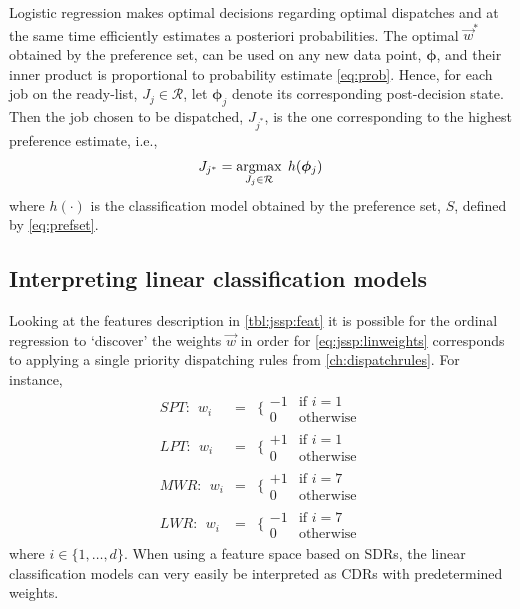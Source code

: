 \documentclass[smallextended]{svjour3}
\renewcommand{\vphi}{\bm \phi}
\begin{document}
	Logistic regression makes optimal decisions regarding optimal dispatches and at the same time efficiently estimates a posteriori probabilities. The optimal $\vec{w}^*$ obtained by the preference set, can be used on any new data point, $\vphi$, and their inner product is proportional to probability estimate \cref{eq:prob}. Hence, for each job on the ready-list, $J_j\in\mathcal{R}$, let $\vphi_j$ denote its corresponding  post-decision state. Then the job chosen to be dispatched, $J_{j^*}$, is the one corresponding to the highest preference estimate, i.e.,
	\begin{equation}\label{eq:lin}
	J_{j^*}=\argmax_{J_j\in \mathcal{R}}\; h(\vphi_j)
	\end{equation}
	where $h(\cdot)$ is the classification model obtained by the preference set, $S$, defined by \cref{eq:prefset}. 
	
	\subsection{Interpreting linear classification models}\label{sec:learningmodels:interpret}
	Looking at the features description in \cref{tbl:jssp:feat} it is possible for the ordinal regression to `discover' the weights $\vec{w}$ in order for \cref{eq:jssp:linweights} corresponds to applying a single priority dispatching rules from \cref{ch:dispatchrules}. For instance, 
	\begin{eqnarray*} %
		SPT:~~w_i&=&\bigg\{ \begin{array}{rl}-1&\text{if }i=1\\0&\text{otherwise}\end{array} \\
		LPT:~~w_i&=&\bigg\{ \begin{array}{rl}+1&\text{if }i=1\\0&\text{otherwise}\end{array} \\
		MWR:~~w_i&=&\bigg\{ \begin{array}{rl}+1&\text{if }i=7\\0&\text{otherwise}\end{array} \\
		LWR:~~w_i&=&\bigg\{ \begin{array}{rl}-1&\text{if }i=7\\0&\text{otherwise}\end{array}
	\end{eqnarray*}
	where $i\in\{1,\ldots,d\}$. %
	When using a feature space based on SDRs, the linear classification models can very easily be interpreted as CDRs with predetermined weights.
	
\end{document}

